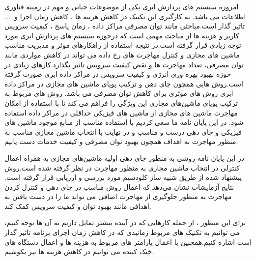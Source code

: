 امروزه سیستم های پردازش ابری یکی از موضوعات حیاتی و مهم در زمینه فناوری اطلاعات می باشد. به کارگیری این تکنیک در کاهش هزینه ها ، کاهش زمان اجرا و .... تاثیر گذار است.مباحثی مانند توان مصرفی مراکز داده ، زمان پاسخ ، کیفیت سرویس کاربر و هزینه  ها از مباحث مهمی است که درحوزه سیستم های پردازش ابری مورد توجه زیادی قرار گرفته است.در نتیجه استفاده از راهکارهای موثر و مدیریت مناسب ماشین های مجازی و کنترل مهاجرت های رخ داده می تواند در کاهش مواردی مانند توان مصرفی، تعداد مهاجرت ها و نقض کیفیت سرویس تاثیر بگذارد.کارهای زیادی در حوزه  بهبود بهره وری انرژی و کیفیت سرویس در مراکز داده ابری صورت گرفته است.روش هایی همچون جای دهی و ترکیب پویای ماشین های مجازی در مراکز داده ابری روش های موثری برای کاهش توان مصرفی می باشد. روش های مربوط به ترکیب پویای ماشین‌های مجازی این ویژگی را فراهم می کند تا با استفاده از امکان مهاجرت ماشین های مجازی از ماشین های فیزیکی حداقلی در مراکز داده استفاده شود. 
در این پایان نامه ما سعی کردیم با  استفاده مناسب از منابع موجود ماشین های فیزیکی و جای دهی درست و مناسب و در نهایت با انتخاب ماشین مجازی مناسب به منظور مهاجرت به اهداف همچون بهبود توان مصرفی و کیفیت خدمات دست یابیم. 

در این پایان نامه روشی به منظور جای دهی اولیه ماشین‌های مجازی به همراه اعمال کنترلی در انتخاب ماشین مجازی به منظور مهاجرت در نظر گرفته شده است.روش پیشنهاد شده از طریق شبیه ساز کلودسیم مورد بررسی و ارزیابی قرار گرفته است. نتایج آزمایشات نشان می‌دهد که اعمال روش مناسب در جای دهی و کنترل کردن مهاجرت به منظور جلوگیری از مهاجرت اضافی  می تواند ما را در دست یافتن به اهدافی مانند بهبود توان و کیفیت سرویس کمک کند.

برای این منظور ، از جمله کارهایی  که در آینده بیشتر  تمایل داریم به آن ها توجه کنیم، می توانیم به تکنیک های مربوط زمانبدی که در کاهش زمان اجرای برنامه تاثیر گذار است اشاره کنیم.همچنین با اعمال پارامتر های مربوط به هزینه ها و اعمال دستگاه های خنک کننده می توانیم در کاهش هزینه ها نیز بکوشیم. 
